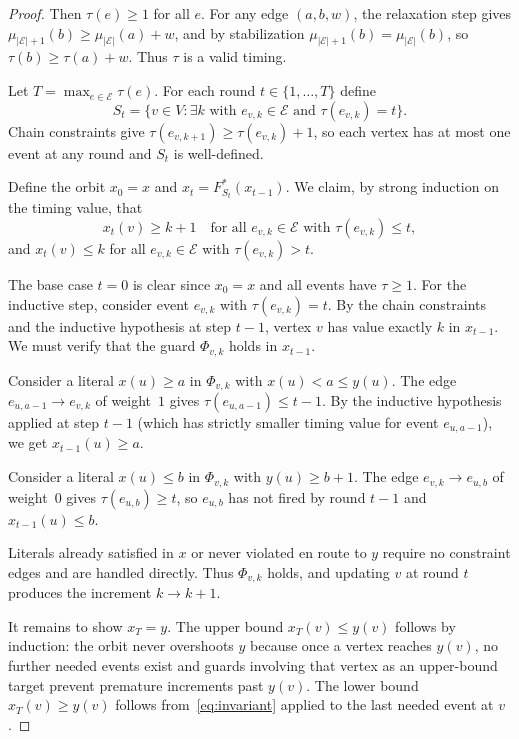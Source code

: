 \documentclass[final,3p,times]{elsarticle}
\theoremstyle{definition}
\theoremstyle{remark}
\newcommand{\cE}{\mathcal{E}}
\begin{document}
\begin{proof}
Then $\tau(e)\ge 1$ for all $e$.
For any edge $(a,b,w)$, the relaxation step gives $\mu_{|\cE|+1}(b)\ge\mu_{|\cE|}(a)+w$, and by stabilization $\mu_{|\cE|+1}(b)=\mu_{|\cE|}(b)$, so $\tau(b)\ge\tau(a)+w$.
Thus $\tau$ is a valid timing.

Let $T=\max_{e\in\cE}\tau(e)$.
For each round $t\in\{1,\dots,T\}$ define
\[
S_t = \{v\in V:\exists k\text{ with }e_{v,k}\in\cE\text{ and }\tau(e_{v,k})=t\}.
\]
Chain constraints give $\tau(e_{v,k+1})\ge\tau(e_{v,k})+1$, so each vertex has at most one event at any round and $S_t$ is well-defined.

Define the orbit $x_0=x$ and $x_t=F^\ast_{S_t}(x_{t-1})$.
We claim, by strong induction on the timing value, that
\begin{equation}\label{eq:invariant}
x_t(v)\ge k+1\quad\text{for all }e_{v,k}\in\cE\text{ with }\tau(e_{v,k})\le t,
\end{equation}
and $x_t(v)\le k$ for all $e_{v,k}\in\cE$ with $\tau(e_{v,k})>t$.

The base case $t=0$ is clear since $x_0=x$ and all events have $\tau\ge 1$.
For the inductive step, consider event $e_{v,k}$ with $\tau(e_{v,k})=t$.
By the chain constraints and the inductive hypothesis at step $t-1$, vertex $v$ has value exactly $k$ in $x_{t-1}$.
We must verify that the guard $\Phi_{v,k}$ holds in $x_{t-1}$.

Consider a literal $x(u)\ge a$ in $\Phi_{v,k}$ with $x(u)<a\le y(u)$.
The edge $e_{u,a-1}\to e_{v,k}$ of weight~$1$ gives $\tau(e_{u,a-1})\le t-1$.
By the inductive hypothesis applied at step $t-1$ (which has strictly smaller timing value for event $e_{u,a-1}$), we get $x_{t-1}(u)\ge a$.

Consider a literal $x(u)\le b$ in $\Phi_{v,k}$ with $y(u)\ge b+1$.
The edge $e_{v,k}\to e_{u,b}$ of weight~$0$ gives $\tau(e_{u,b})\ge t$, so $e_{u,b}$ has not fired by round $t-1$ and $x_{t-1}(u)\le b$.

Literals already satisfied in $x$ or never violated en route to $y$ require no constraint edges and are handled directly.
Thus $\Phi_{v,k}$ holds, and updating $v$ at round $t$ produces the increment $k\to k+1$.

It remains to show $x_T=y$.
The upper bound $x_T(v)\le y(v)$ follows by induction: the orbit never overshoots $y$ because once a vertex reaches $y(v)$, no further needed events exist and guards involving that vertex as an upper-bound target prevent premature increments past $y(v)$.
The lower bound $x_T(v)\ge y(v)$ follows from~\eqref{eq:invariant} applied to the last needed event at $v$.
\end{proof}
\end{document}
